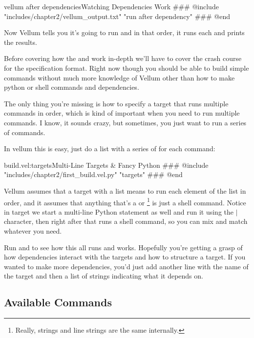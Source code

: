 \begin{code}{vellum after dependencies}{Watching Dependencies Work}
### @include "includes/chapter2/vellum_output.txt" "run after dependency"
### @end
\end{code}

Now Vellum tells you it's going to run  and  in
that order, it runs each and prints the results.

Before covering how the  and  work in-depth we'll
have to cover the crash course for the specification format.  Right now though
you should be able to build simple commands without much more knowledge of
Vellum other than how to make python or shell commands and dependencies.

The only thing you're missing is how to specify a target that runs multiple
commands in order, which is kind of important when you need to run multiple
commands.  I know, it sounds crazy, but sometimes, you just want to run a series
of commands.

In vellum this is easy, just do a list with a series of  for
each command:

\begin{code}{build.vel:targets}{Multi-Line Targets \& Fancy Python}
### @include "includes/chapter2/first_build.vel.py" "targets"
### @end
\end{code}

Vellum assumes that a target with a list means to run each element of the list
in order, and it assumes that anything that's a  or \footnote{Really, strings and line strings are the same internally.}
is just a shell command.  Notice in target  we start a
multi-line Python statement as well and run it using the $|$ character, then
right after that runs a shell command, so you can mix and match whatever you
need.

Run  and  to see how this all runs and works.
Hopefully you're getting a grasp of how dependencies interact with the targets
and how to structure a target.  If you wanted to make more dependencies, you'd
just add another line with the name of the target and then a list of strings
indicating what it depends on.



\subsection{Available Commands}

